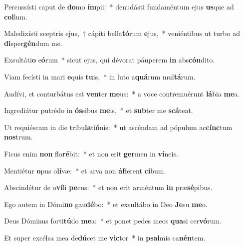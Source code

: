 \item Percussísti caput de \textbf{do}mo \textbf{ím}pii:~* denudásti fundaméntum ejus \textbf{us}que ad \textbf{col}lum.
\item Maledixísti sceptris ejus,~† cápiti bella\textbf{tó}rum \textbf{e}jus,~* veniéntibus ut turbo ad \textbf{di}sper\textbf{gén}dum me.
\item Exsultáti\textbf{o} e\textbf{ó}rum~* sicut ejus, qui dévorat páuperem \textbf{in} abs\textbf{cón}dito.
\item Viam fecísti in mari \textbf{e}quis \textbf{tu}is,~* in luto a\textbf{quá}rum mul\textbf{tá}rum.
\item Audívi, et conturbátus est \textbf{ven}ter \textbf{me}us:~* a voce contremuérunt \textbf{lá}bia \textbf{me}a.
\item Ingrediátur putrédo in \textbf{ós}sibus \textbf{me}is,~* et \textbf{sub}ter me \textbf{scá}teat.
\item Ut requiéscam in die tribu\textbf{la}ti\textbf{ó}nis:~* ut ascéndam ad pópulum ac\textbf{cínc}tum \textbf{nos}trum.
\item Ficus enim \textbf{non} flo\textbf{ré}bit:~* et non erit \textbf{ger}men in \textbf{ví}neis.
\item Mentiétur \textbf{o}pus o\textbf{lí}væ:~* et arva non \textbf{áf}ferent \textbf{ci}bum.
\item Abscindétur de o\textbf{ví}li \textbf{pe}cus:~* et non erit arméntum \textbf{in} præ\textbf{sé}pibus.
\item Ego autem in Dómi\textbf{no} gau\textbf{dé}bo:~* et exsultábo in Deo \textbf{Je}su \textbf{me}o.
\item Deus Dóminus forti\textbf{tú}do \textbf{me}a:~* et ponet pedes meos \textbf{qua}si cer\textbf{vó}rum.
\item Et super excélsa mea de\textbf{dú}cet me \textbf{vic}tor~* in \textbf{psal}mis ca\textbf{nén}tem.
